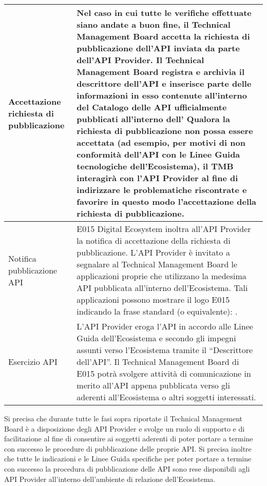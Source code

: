 \documentclass[letterpaper,10pt,italian]{sphinxmanual}
\begin{document}
\begin{savenotes}
\begin{tabulary}{\linewidth}[t]{|T|T|}
\\
\hline
Accettazione richiesta di pubblicazione
&
Nel caso in cui tutte le verifiche effettuate siano andate a buon fine, il Technical Management Board accetta la richiesta di pubblicazione dell’API inviata da parte dell’API Provider. Il Technical Management Board registra e archivia il descrittore dell’API e inserisce parte delle informazioni in esso contenute all’interno del Catalogo delle API ufficialmente pubblicati all’interno dell’ Qualora la richiesta di pubblicazione non possa essere accettata (ad esempio, per motivi di non conformità dell’API con le Linee Guida tecnologiche dell’Ecosistema), il TMB interagirà con l’API Provider al fine di indirizzare le problematiche riscontrate e favorire in questo modo l’accettazione della richiesta di pubblicazione.
\\
\hline
Notifica pubblicazione API
&
E015 Digital Ecosystem inoltra all’API Provider la notifica di accettazione della richiesta di pubblicazione. L’API Provider è invitato a segnalare al Technical Management Board le applicazioni proprie che utilizzano la medesima API pubblicata all’interno dell’Ecosistema. Tali applicazioni possono mostrare il logo E015 indicando la frase standard (o equivalente): .
\\
\hline
Esercizio API
&
L’API Provider eroga l’API in accordo alle Linee Guida dell’Ecosistema e secondo gli impegni assunti verso l’Ecosistema tramite  il “Descrittore dell’API”. Il Technical Management Board di E015 potrà svolgere attività di comunicazione in merito all’API appena pubblicata verso gli aderenti all’Ecosistema o altri soggetti interessati.
\\
\hline
\end{tabulary}
\par
\sphinxattableend\end{savenotes}

Si precisa che durante tutte le fasi sopra riportate il Technical Management Board è a disposizione degli API Provider e svolge un ruolo di supporto e di facilitazione al fine di consentire ai soggetti aderenti di poter portare a termine con successo le procedure di pubblicazione delle proprie API.
Si precisa inoltre che tutte le indicazioni e le Linee Guida specifiche per poter portare a termine con successo la procedura di pubblicazione delle API sono rese disponibili agli API Provider all’interno dell’ambiente di relazione dell’Ecosistema.
\end{document}
